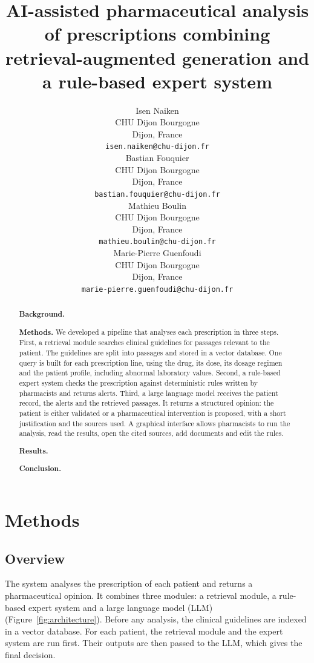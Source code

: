 \documentclass{article}
\title{AI-assisted pharmaceutical analysis of prescriptions combining retrieval-augmented generation and a rule-based expert system}
\author{
	Isen Naiken \\
	CHU Dijon Bourgogne \\
	Dijon, France \\
	\texttt{isen.naiken@chu-dijon.fr} \\
	\And
	Bastian Fouquier \\
	CHU Dijon Bourgogne \\
	Dijon, France \\
	\texttt{bastian.fouquier@chu-dijon.fr} \\
	\AND
	Mathieu Boulin \\
	CHU Dijon Bourgogne \\
	Dijon, France \\
	\texttt{mathieu.boulin@chu-dijon.fr} \\
	\And
	Marie-Pierre Guenfoudi \\
	CHU Dijon Bourgogne \\
	Dijon, France \\
	\texttt{marie-pierre.guenfoudi@chu-dijon.fr} \\
}
\begin{document}
\maketitle

\begin{abstract}
	\textbf{Background.} %

	\textbf{Methods.} We developed a pipeline that analyses each prescription in three steps. First, a retrieval module searches clinical guidelines for passages relevant to the patient. The guidelines are split into passages and stored in a vector database. One query is built for each prescription line, using the drug, its dose, its dosage regimen and the patient profile, including abnormal laboratory values. Second, a rule-based expert system checks the prescription against deterministic rules written by pharmacists and returns alerts. Third, a large language model receives the patient record, the alerts and the retrieved passages. It returns a structured opinion: the patient is either validated or a pharmaceutical intervention is proposed, with a short justification and the sources used. A graphical interface allows pharmacists to run the analysis, read the results, open the cited sources, add documents and edit the rules.

	\textbf{Results.} %

	\textbf{Conclusion.} %
\end{abstract}





\section{Methods}
\label{sec:methods}

\subsection{Overview}

The system analyses the prescription of each patient and returns a pharmaceutical opinion. It combines three modules: a retrieval module, a rule-based expert system and a large language model (LLM) (Figure~\ref{fig:architecture}). Before any analysis, the clinical guidelines are indexed in a vector database. For each patient, the retrieval module and the expert system are run first. Their outputs are then passed to the LLM, which gives the final decision.
\end{document}
